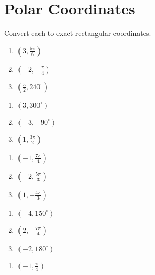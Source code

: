 \chapter{Polar Coordinates}

Convert each to exact rectangular coordinates.
\begin{multicols}{3}
\begin{enumerate}
	\item $\left(3, \frac{5\pi}{6}\right)$
    \item $\left(-2, -\frac{\pi}{4}\right)$		
    \item $\left(\frac{5}{2}, 240^\circ\right)$
\end{enumerate}	\setcounter{Review}{\value{enumi}}
\end{multicols}
\begin{multicols}{3}
\begin{enumerate}	\setcounter{enumi}{\value{Review}}
    \item $\left(3, 300^\circ\right)$	
    \item $\left(-3, -90^\circ\right)$	
    \item $\left(1, \frac{3\pi}{2}\right)$
\end{enumerate}	\setcounter{Review}{\value{enumi}}
\end{multicols}
\begin{multicols}{3}
\begin{enumerate}	\setcounter{enumi}{\value{Review}}
    \item $\left(-1, \frac{7\pi}{4}\right)$
    \item $\left(-2, \frac{5\pi}{3}\right)$
    \item $\left(1, -\frac{4\pi}{3}\right)$
\end{enumerate}	\setcounter{Review}{\value{enumi}}
\end{multicols}
\begin{multicols}{3}
\begin{enumerate}	\setcounter{enumi}{\value{Review}}
    \item $\left(-4, 150^\circ\right)$	
    \item $\left(2, -\frac{7\pi}{4}\right)$
    \item $\left(-2, 180^\circ\right)$	
\end{enumerate}	\setcounter{Review}{\value{enumi}}
\end{multicols}
\begin{multicols}{3}
\begin{enumerate}	\setcounter{enumi}{\value{Review}}
    \item $\left(-1, \frac{\pi}{4}\right)$
\end{enumerate}	\setcounter{Review}{\value{enumi}}
\end{multicols}
\smallskip

